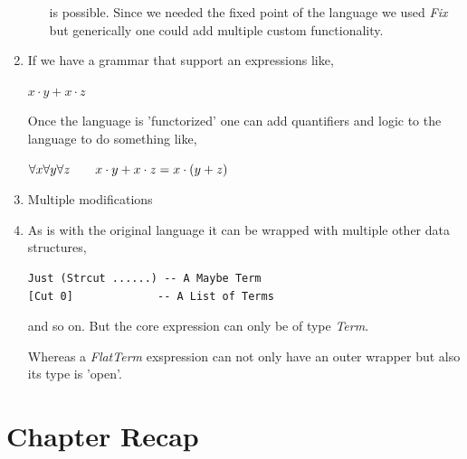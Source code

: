 \documentclass[thesis-solanki.tex]{subfiles}
\begin{document}
\begin{enumerate}
\begin{enumerate}
is possible. Since we needed the fixed point of the language we used \textit{Fix} but generically one could add multiple custom 
functionality.  

\end{enumerate}  


\item If we have a grammar that support an expressions like,


\begin{math}
x \cdot y + x \cdot z
\end{math} 

Once the language is 'functorized' one can add quantifiers and logic to the language to do something like,


\begin{math}
\forall x \forall y \forall z \qquad x \cdot y + x \cdot z \newline
\hfill   = x \cdot (y + z)	
\end{math}

\item Multiple modifications

\item As is with the original language it can be wrapped with multiple other data structures,

\begin{verbatim}
Just (Strcut ......) -- A Maybe Term
[Cut 0]				-- A List of Terms
\end{verbatim} 
and so on. But the core expression can only be of type \textit{Term}. 

Whereas a \textit{FlatTerm} exspression can not only have an outer wrapper but also its type is 'open'.   



\end{enumerate}



\section{Chapter Recap}
\end{document}
